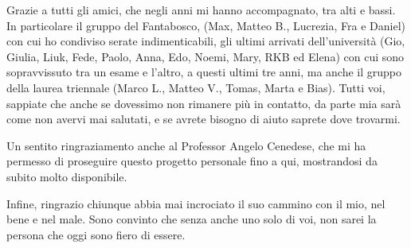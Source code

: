 Grazie a tutti gli amici, che negli anni mi hanno accompagnato, tra alti e bassi. In particolare il gruppo del Fantabosco,
(Max, Matteo B., Lucrezia, Fra e Daniel) con cui ho condiviso serate indimenticabili, gli ultimi arrivati dell'università
(Gio, Giulia, Liuk, Fede, Paolo, Anna, Edo, Noemi, Mary, RKB ed Elena) con cui sono sopravvissuto tra un esame e l'altro,
a questi ultimi tre anni, ma anche il gruppo della laurea triennale (Marco L., Matteo V., Tomas, Marta e Bias).
Tutti voi, sappiate che anche se dovessimo non rimanere più in contatto, da parte mia sarà come non avervi mai salutati,
e se avrete bisogno di aiuto saprete dove trovarmi.

Un sentito ringraziamento anche al Professor Angelo Cenedese, che mi ha permesso di proseguire questo progetto personale
fino a qui, mostrandosi da subito molto disponibile.

Infine, ringrazio chiunque abbia mai incrociato il suo cammino con il mio, nel bene e nel male. Sono convinto che senza
anche uno solo di voi, non sarei la persona che oggi sono fiero di essere.
